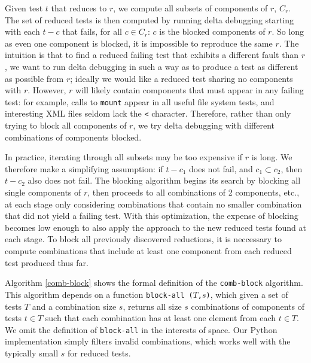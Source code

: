 Given test $t$ that reduces to $r$, we compute all subsets of
components of $r$, $C_r$.  The set of reduced tests is then computed
by running delta debugging starting with each $t-c$ that fails, for all
$c \in C_r$: $c$ is the blocked components of $r$.  So long as even
one component is blocked, it is impossible to reproduce the same $r$.
The intuition is that to find a reduced failing test that exhibits a
different fault than $r$, we want to run delta debugging in such a way
as to produce a test as different as possible from $r$; ideally we
would like a reduced test sharing no components with $r$.  However,
$r$ will likely contain components that must appear in any failing
test: for example, calls to {\tt mount} appear in all useful file
system tests, and interesting XML files seldom lack the {\tt <}
character.  Therefore, rather than only trying to block all components of $r$,
we try delta debugging with different combinations of components blocked.

In practice, iterating through all subsets may be too expensive if $r$
is long.  We therefore make a simplifying assumption:  if $t-c_1$ does not fail,
and $c_1 \subset c_2$, then $t-c_2$ also does not fail.  The blocking
algorithm begins its search by blocking all single components of $r$,
then proceeds to all combinations of 2 components, etc., at each stage
only considering combinations that contain no smaller combination that did not
yield a failing test.  With this optimization, the expense of blocking
becomes low enough to also apply the approach to the new
reduced tests found at each stage.  To block all previously discovered
reductions, it is neccessary to compute combinations that include at
least one component from each reduced test produced thus far.

 Algorithm \ref{comb-block} shows
the formal definition of the {\tt comb-block} algorithm.  This algorithm depends on a
function {\tt block-all ($T$,$s$)}, which given a set of tests $T$ and
a combination size $s$,  returns all size $s$ combinations of components of tests $t
\in T$ such that each combination has at least one element
from each $t \in T$.  We omit the definition of {\tt block-all} in
the interests of space.  Our Python implementation \cite{tstl} simply
filters invalid combinations, which works well with the typically
small $s$ for reduced tests.

